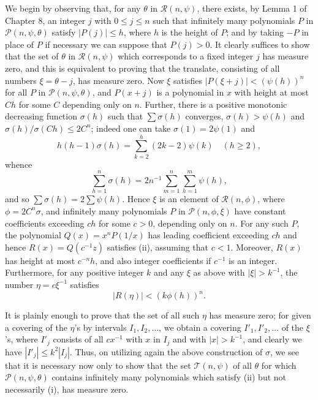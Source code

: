 We begin by observing that, for any $\theta$ in $\mathscr{R}(n, \psi)$, there exists, by Lemma 1 of Chapter 8, an integer $j$ with $0 \le j \le n$ such that infinitely many polynomials $P$ in $\mathscr{P}(n, \psi, \theta)$ satisfy $|P(j)| \le h$, where $h$ is the height of $P$; and by taking $-P$ in place of $P$ if necessary we can suppose that $P(j) > 0$. It clearly suffices to show that the set of $\theta$ in $\mathscr{R}(n, \psi)$ which corresponds to a fixed integer $j$ has measure zero, and this is equivalent to proving that the translate, consisting of all numbers $\xi = \theta - j$, has measure zero. Now $\xi$ satisfies $|P(\xi+j)| < (\psi(h))^n$ for all $P$ in $\mathscr{P}(n, \psi, \theta)$, and $P(x+j)$ is a polynomial in $x$ with height at most $Ch$ for some $C$ depending only on $n$. Further, there is a positive monotonic decreasing function $\sigma(h)$ such that $\sum \sigma(h)$ converges, $\sigma(h) > \psi(h)$ and $\sigma(h)/\sigma(Ch) \le 2C^n$; indeed one can take $\sigma(1) = 2\psi(1)$ and
\[h(h-1) \sigma(h) = \sum_{k=2}^{h} (2k-2) \psi(k) \quad (h \geqslant 2),\]
whence
\[\sum_{h=1}^{n} \sigma(h) = 2n^{-1} \sum_{m=1}^{n} \sum_{h=1}^{m} \psi(h),\]
and so $\sum \sigma(h) = 2\sum \psi(h)$. Hence $\xi$ is an element of $\mathscr{R}(n, \phi)$, where $\phi = 2C^n\sigma$, and infinitely many polynomials $P$ in $\mathscr{P}(n, \phi, \xi)$ have constant coefficients exceeding $ch$ for some $c > 0$, depending only on $n$. For any such $P$, the polynomial $Q(x) = x^n P(1/x)$ has leading coefficient exceeding $ch$ and hence $R(x) = Q(c^{-1}z)$ satisfies (ii), assuming that $c < 1$. Moreover, $R(x)$ has height at most $c^{-n}h$, and also integer coefficients if $c^{-1}$ is an integer. Furthermore, for any positive integer $k$ and any $\xi$ as above with $|\xi| > k^{-1}$, the number $\eta = c\xi^{-1}$ satisfies
\[|R(\eta)| < (k\phi(h))^n.\]

It is plainly enough to prove that the set of all such $\eta$ has measure zero; for given a covering of the $\eta$'s by intervals $I_1, I_2, \ldots$, we obtain a covering $I'_1, I'_2, \ldots$ of the $\xi$'s, where $I'_j$ consists of all $cx^{-1}$ with $x$ in $I_j$ and with $|x| > k^{-1}$, and clearly we have $|I'_j| \leq k^2 |I_j|$. Thus, on utilizing again the above construction of $\sigma$, we see that it is necessary now only to show that the set $\mathscr{T}(n, \psi)$ of all $\theta$ for which $\mathscr{P}(n, \psi, \theta)$ contains infinitely many polynomials which satisfy (ii) but not necessarily (i), has measure zero.


